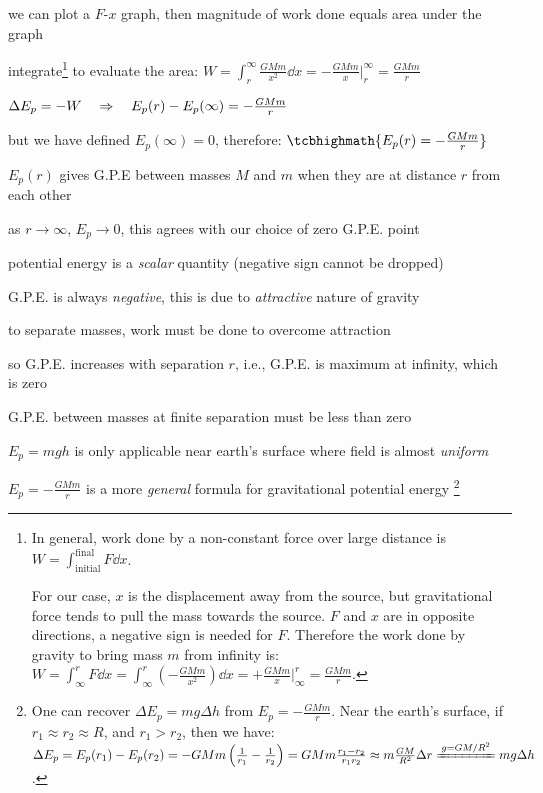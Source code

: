 we can plot a $F$-$x$ graph, then magnitude of work done equals area under the graph

integrate\footnote{In general, work done by a non-constant force over large distance is $W = \int_\text{initial}^\text{final} F \dd x $.
	
For our case, $x$ is the displacement away from the source, but gravitational force tends to pull the mass towards the source. $F$ and $x$ are in opposite directions, a negative sign is needed for $F$. Therefore the work done by gravity to bring mass $m$ from infinity is: $W = \int_\infty^r F \dd x = \int_\infty^r \left(-\frac{GMm}{x^2}\right)\dd x = +\frac{GMm}{x} \Bigg|_\infty^r = \frac{GMm}{r}$.} to evaluate the area: $W = \int_r^\infty \frac{GMm}{x^2} \dd x = - \frac{GMm}{x}\Bigg|^\infty_r = \frac{GMm}{r}$


$\Delta E_p = -W \quad \Rightarrow \quad E_p(r) - E_p(\infty) = - \frac{GMm}{r}$

but we have defined $E_p(\infty)=0$, therefore: $\tcbhighmath{E_p(r)= -\frac{GMm}{r}}$

$E_p(r)$ gives G.P.E between masses $M$ and $m$ when they are at distance $r$ from each other

\cmt as $r \to \infty$, $E_p \to 0$, this agrees with our choice of zero G.P.E. point

\cmt potential energy is a \emph{scalar} quantity (negative sign cannot be dropped)

\cmt G.P.E. is always \emph{negative}, this is due to \emph{attractive} nature of gravity

to separate masses, work must be done to overcome attraction

so G.P.E. increases with separation $r$, i.e., G.P.E. is maximum at infinity, which is zero

G.P.E. between masses at finite separation must be less than zero

\cmt $E_p=mgh$ is only applicable near earth's surface where field is almost \emph{uniform}

$E_p =-\frac{GMm}{r}$ is a more \emph{general} formula for gravitational potential energy
\footnote{One can recover $\Delta E_p=mg\Delta h$ from $E_p=-\frac{GMm}{r}$. Near the earth's surface, if $r_1\approx r_2\approx R$, and $r_1>r_2$, then we have: $\Delta E_p = E_p(r_1) - E_p(r_2) = -GMm\left(\frac{1}{r_1}-\frac{1}{r_2}\right) = GMm \frac{r_1-r_2}{r_1r_2} \approx m \frac{GM}{R^2} \Delta r \xlongequal{g=GM/R^2} mg\Delta h$.}



